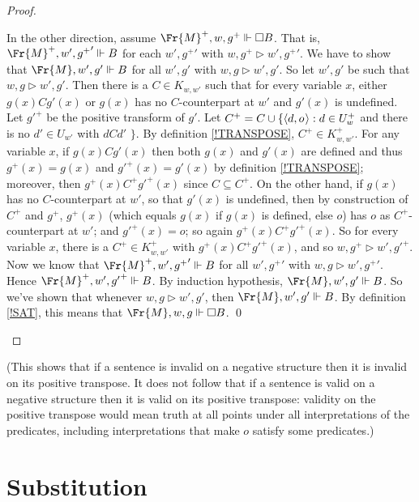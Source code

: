\documentclass[11pt]{woarticle}
\theoremstyle{break}
\theoremstyle{nonumberplain}
\newcommand{\SAT}{\Vdash}
\newcommand{\Img}{\triangleright}
\newcommand{\1}{\;\,|\;\,}
\renewcommand{\t}[1]{\ensuremath{\langle #1  \makebox[.2ex]{}\rangle}}
\begin{document}
\begin{proof}
\begin{enumerate}
          In the other direction, assume $\Fr{M}^{+},w, g^+ \SAT \Box B$. That
          is, $\Fr{M}^{+},w',{g^+}' \SAT B$ for each $w',{g^+}'$ with
          $w,g^{+} \Img w',{g^+}'$. We have to show that $\Fr{M},w',g' \SAT B$
          for all $w',g'$ with $w,g \Img w',g'$. So let $w',g'$ be such that
          $w,g \Img w',g'$. Then there is a $C \in K_{w,w'}$ such that for every
          variable $x$, either $g(x)Cg'(x)$ or $g(x)$ has no $C$-counterpart at
          $w'$ and $g'(x)$ is undefined. Let ${g'}^+$ be the positive transform
          of $g'$. Let $C^+ = C \cup \{ \t{d,o} : d\in U^+_{w}$ and there is no
          $d'\in U_{w'}$ with $dCd'$ $\}$. By definition \ref{!TRANSPOSE},
          $C^+ \in K^+_{w,w'}$. For any variable $x$, if $g(x)Cg'(x)$ then both
          $g(x)$ and $g'(x)$ are defined and thus $g^+(x) = g(x)$ and
          ${g'}^+(x) = g'(x)$ by definition \ref{!TRANSPOSE}; moreover, then
          $g^+(x)C^+{g'}^+(x)$ since $C \subseteq C^+$. On the other hand, if
          $g(x)$ has no $C$-counterpart at $w'$, so that $g'(x)$ is undefined,
          then by construction of $C^+$ and $g^+$, $g^+(x)$ (which equals $g(x)$
          if $g(x)$ is defined, else $o$) has $o$ as $C^+$-counterpart at $w'$;
          and ${g'}^+(x)=o$; so again $g^+(x)C^+{g'}^+(x)$. So for every
          variable $x$, there is a $C^+ \in K^+_{w,w'}$ with
          $g^+(x)C^+{g'}^+(x)$, and so $w,g^+ \Img w',{g'}^+$. Now we know that
          $\Fr{M}^{+},w',{g^+}' \SAT B$ for all $w',{g^+}'$ with
          $w,g \Img w',{g^+}'$. Hence $\Fr{M}^{+},w',{g'}^+ \SAT B$. By
          induction hypothesis, $\Fr{M},w',g' \SAT B$. So we've shown that
          whenever $w,g \Img w',g'$, then $\Fr{M},w',g' \SAT B$. By definition
          \ref{!SAT}, this means that $\Fr{M},w,g \SAT \Box B$. \qed
  \end{enumerate}
\end{proof}

(This shows that if a sentence is invalid on a negative structure then it is
invalid on its positive transpose. It does not follow that if a sentence is
valid on a negative structure then it is valid on its positive transpose:
validity on the positive transpose would mean truth at all points under all
interpretations of the predicates, including interpretations that make $o$
satisfy some predicates.)

\section{Substitution}\label{sec:substitution}
\end{document}

